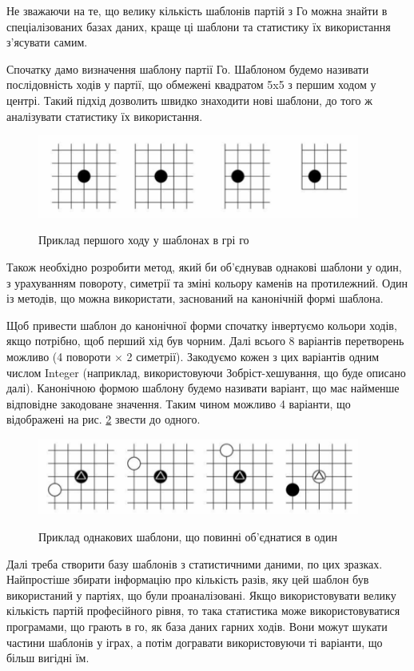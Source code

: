 Не зважаючи на те, що велику кількість шаблонів партій з Го можна знайти в спеціалізованих базах даних, краще ці шаблони та статистику їх використання з'ясувати самим.

Спочатку дамо визначення шаблону партії Го. Шаблоном будемо називати послідовність ходів у партії, що обмежені квадратом 5x5 з першим ходом у центрі. Такий підхід дозволить швидко знаходити нові шаблони, до того ж аналізувати статистику їх використання.

\begin{figure}[H]
	\centering
	\caption{Приклад першого ходу у шаблонах в грі го}
	\includegraphics[width=300pt]{go_pattern_example}
	\label{fig:go_pattern_example}
\end{figure}

Також необхідно розробити метод, який би об'єднував однакові шаблони у один, з урахуванням повороту, симетрії та зміні кольору каменів на протилежний. Один із методів, що можна використати, заснований на канонічній формі шаблона.

Щоб привести шаблон до канонічної форми спочатку інвертуємо кольори ходів, якщо потрібно, щоб перший хід був чорним. Далі всього 8 варіантів перетворень можливо (4 повороти $\times$ 2 симетрії). Закодуємо кожен з цих варіантів одним числом Integer (наприклад, використовуючи Зобріст-хешування, що буде описано далі). Канонічною формою шаблону будемо називати варіант, що має найменше відповідне закодоване значення. Таким чином можливо 4 варіанти, що відображені на рис. \ref{fig:go_canonical_pattern} звести до одного.

\begin{figure}[H]
	\centering
	\caption{Приклад однакових шаблони, що повинні об'єднатися в один}
	\includegraphics[width=300pt]{go_canonical_pattern}
	\label{fig:go_canonical_pattern}
\end{figure}

Далі треба створити базу шаблонів з статистичними даними, по цих зразках. Найпростіше збирати інформацію про кількість разів, яку цей шаблон був використаний у партіях, що були проаналізовані. Якщо використовувати велику кількість партій професійного рівня, то така статистика може використовуватися програмами, що грають в го, як база даних гарних ходів. Вони можут шукати частини шаблонів у іграх, а потім догравати використовуючи ті варіанти, що більш вигідні їм.

